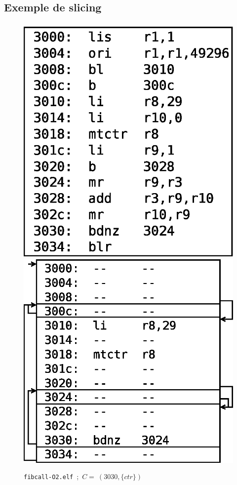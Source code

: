\documentclass{beamer}
\begin{document}
  \subsection*{Exemple de slicing}
  \begin{frame}
    \frametitle{\secname}
    \framesubtitle{\subsecname}
    
    \begin{figure}
      \centering
      \includegraphics[scale=.5]{img/dump.eps}\hspace{1cm}
      \includegraphics[scale=.5]{img/slice.eps}
      \caption{\texttt{fibcall-O2.elf}~;~$C =~(3030, \{ctr\})$}
    \end{figure}
  \end{frame}
  
\end{document}
